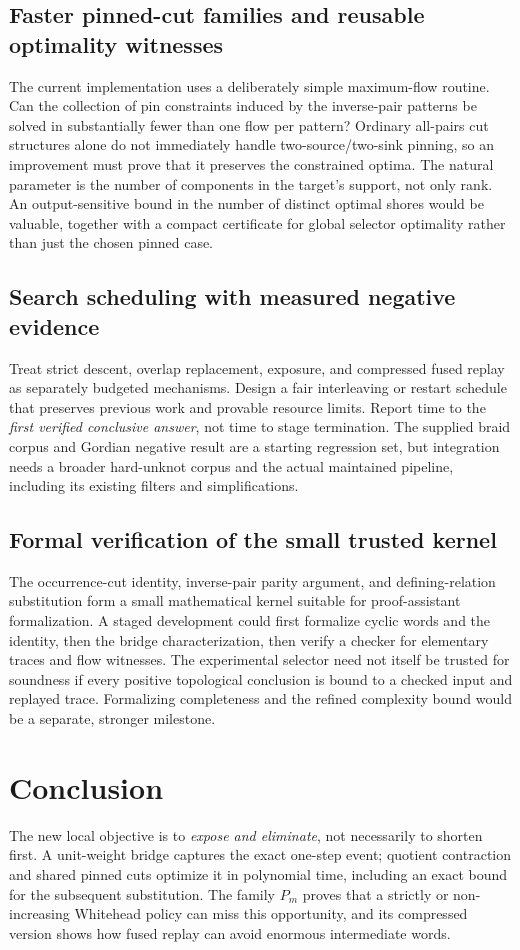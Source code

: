 \documentclass[11pt,letterpaper]{article}
\theoremstyle{definition}\newtheorem{definition}[theorem]{Definition}
\begin{document}
\subsection{Faster pinned-cut families and reusable optimality witnesses}
The current implementation uses a deliberately simple maximum-flow routine. Can the collection of pin constraints induced by the inverse-pair patterns be solved in substantially fewer than one flow per pattern? Ordinary all-pairs cut structures alone do not immediately handle two-source/two-sink pinning, so an improvement must prove that it preserves the constrained optima. The natural parameter is the number of components in the target's support, not only rank. An output-sensitive bound in the number of distinct optimal shores would be valuable, together with a compact certificate for global selector optimality rather than just the chosen pinned case.

\subsection{Search scheduling with measured negative evidence}
Treat strict descent, overlap replacement, exposure, and compressed fused replay as separately budgeted mechanisms. Design a fair interleaving or restart schedule that preserves previous work and provable resource limits. Report time to the \emph{first verified conclusive answer}, not time to stage termination. The supplied braid corpus and Gordian negative result are a starting regression set, but integration needs a broader hard-unknot corpus and the actual maintained pipeline, including its existing filters and simplifications.

\subsection{Formal verification of the small trusted kernel}
The occurrence-cut identity, inverse-pair parity argument, and defining-relation substitution form a small mathematical kernel suitable for proof-assistant formalization. A staged development could first formalize cyclic words and the identity, then the bridge characterization, then verify a checker for elementary traces and flow witnesses. The experimental selector need not itself be trusted for soundness if every positive topological conclusion is bound to a checked input and replayed trace. Formalizing completeness and the refined complexity bound would be a separate, stronger milestone.

\section{Conclusion}
The new local objective is to \emph{expose and eliminate}, not necessarily to shorten first. A unit-weight bridge captures the exact one-step event; quotient contraction and shared pinned cuts optimize it in polynomial time, including an exact bound for the subsequent substitution. The family $P_m$ proves that a strictly or non-increasing Whitehead policy can miss this opportunity, and its compressed version shows how fused replay can avoid enormous intermediate words.
\end{document}
